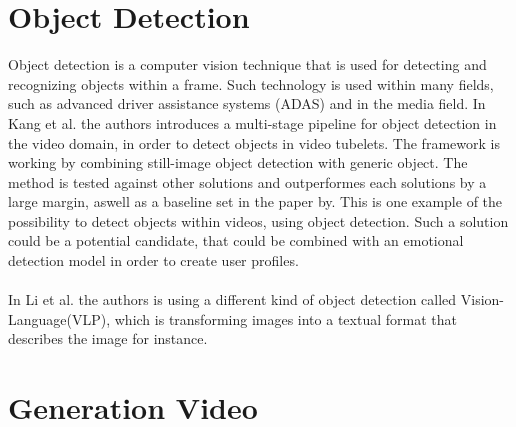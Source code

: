 \section{Object Detection}
Object detection is a computer vision technique that is used for detecting and recognizing objects within a frame\cite{WhatIsObjectDetection}. Such technology is used within many fields, such as advanced driver assistance systems (ADAS) and in the media field. In Kang et al. the authors introduces a multi-stage pipeline for object detection in the video domain, in order to detect objects in video tubelets. The framework is working by combining still-image object detection with generic object. The method is tested against other solutions and outperformes each solutions by a large margin, aswell as a baseline set in the paper by. This is one example of the possibility to detect objects within videos, using object detection. Such a solution could be a potential candidate, that could be combined with an emotional detection model in order to create user profiles. 
\\ \\
In Li et al\cite{BLIP}. the authors is using a different kind of object detection called Vision-Language(VLP), which is transforming images into a textual format that describes the image for instance. 

\section{Generation Video}



